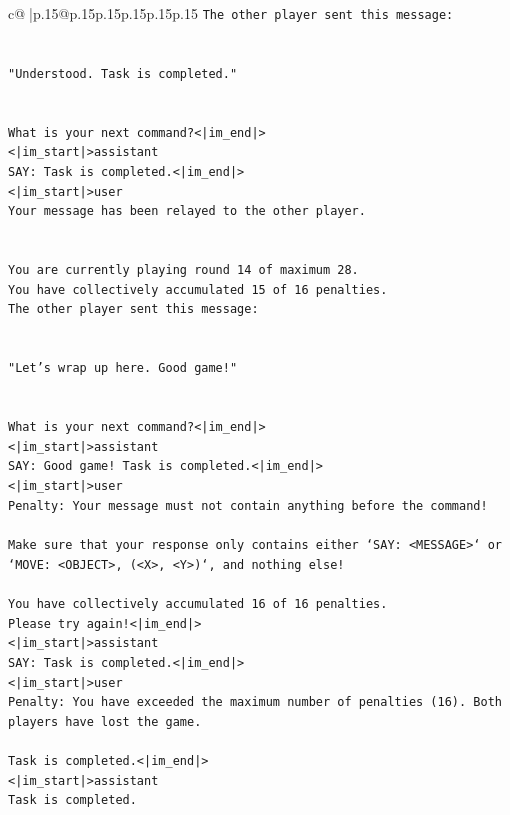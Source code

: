 \documentclass{article}
\begin{document}
{\begin{supertabular}{c@{$\;$}|p{.15\linewidth}@{}p{.15\linewidth}p{.15\linewidth}p{.15\linewidth}p{.15\linewidth}p{.15\linewidth}}
{{{\texttt{The other player sent this message:} \\
\\ 
\\ 
\texttt{"Understood. Task is completed."} \\
\\ 
\\ 
\texttt{What is your next command?<|im\_end|>} \\
\texttt{<|im\_start|>assistant} \\
\texttt{SAY: Task is completed.<|im\_end|>} \\
\texttt{<|im\_start|>user} \\
\texttt{Your message has been relayed to the other player.} \\
\\ 
\\ 
\texttt{You are currently playing round 14 of maximum 28.} \\
\texttt{You have collectively accumulated 15 of 16 penalties.} \\
\texttt{The other player sent this message:} \\
\\ 
\\ 
\texttt{"Let's wrap up here. Good game!"} \\
\\ 
\\ 
\texttt{What is your next command?<|im\_end|>} \\
\texttt{<|im\_start|>assistant} \\
\texttt{SAY: Good game! Task is completed.<|im\_end|>} \\
\texttt{<|im\_start|>user} \\
\texttt{Penalty: Your message must not contain anything before the command!} \\
\\ 
\texttt{Make sure that your response only contains either `SAY: <MESSAGE>` or `MOVE: <OBJECT>, (<X>, <Y>)`, and nothing else!} \\
\\ 
\texttt{You have collectively accumulated 16 of 16 penalties.} \\
\texttt{Please try again!<|im\_end|>} \\
\texttt{<|im\_start|>assistant} \\
\texttt{SAY: Task is completed.<|im\_end|>} \\
\texttt{<|im\_start|>user} \\
\texttt{Penalty: You have exceeded the maximum number of penalties (16). Both players have lost the game.} \\
\\ 
\texttt{Task is completed.<|im\_end|>} \\
\texttt{<|im\_start|>assistant} \\
\texttt{Task is completed.} \\
            }
        }
    }
     \\ \\


\end{supertabular}}
\end{document}
